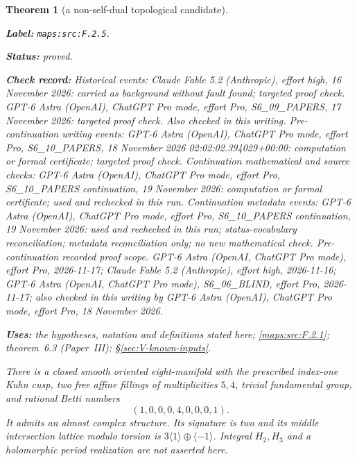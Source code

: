\documentclass[11pt,a4paper]{article}
\newtheorem{theorem}{Theorem}[section]
\theoremstyle{definition}
\newcommand{\StatementRecord}[4]{\par\smallskip\begingroup\upshape\raggedright\noindent\textbf{Label:} \nolinkurl{#1}.\par\noindent\textbf{Status:} #2.\par\noindent\textbf{Check record:} #3.\par\noindent\textbf{Uses:} #4.\par\endgroup\smallskip}
\newcommand{\ExternalPaperRef}[3]{\ifmmode\text{\upshape #1#2 (Paper~#3)}\else #1#2 (Paper~#3)\fi}
\begin{document}
\begin{theorem}[a non-self-dual topological candidate]\label{maps:src:F.2.5}
\StatementRecord{maps:src:F.2.5}{proved}{Historical events: Claude Fable 5.2 (Anthropic), effort high, 16 November 2026: carried as background without fault found; targeted proof check. GPT-6 Astra (OpenAI), ChatGPT Pro mode, effort Pro, S6\_09\_PAPERS, 17 November 2026: targeted proof check. Also checked in this writing. Pre-continuation writing events: GPT-6 Astra (OpenAI), ChatGPT Pro mode, effort Pro, S6\_10\_PAPERS, 18 November 2026 02:02:02.394029+00:00: computation or formal certificate; targeted proof check. Continuation mathematical and source checks: GPT-6 Astra (OpenAI), ChatGPT Pro mode, effort Pro, S6\_10\_PAPERS continuation, 19 November 2026: computation or formal certificate; used and rechecked in this run. Continuation metadata events: GPT-6 Astra (OpenAI), ChatGPT Pro mode, effort Pro, S6\_10\_PAPERS continuation, 19 November 2026: used and rechecked in this run; status-vocabulary reconciliation; metadata reconciliation only; no new mathematical check. \emph{Pre-continuation recorded proof scope.} GPT-6 Astra (OpenAI, ChatGPT Pro mode), effort Pro, 2026-11-17; Claude Fable 5.2 (Anthropic), effort high, 2026-11-16; GPT-6 Astra (OpenAI, ChatGPT Pro mode), S6\_06\_BLIND, effort Pro, 2026-11-17; also checked in this writing by GPT-6 Astra (OpenAI), ChatGPT Pro mode, effort Pro, 18 November 2026}{the hypotheses, notation and definitions stated here; \cref{maps:src:F.2.1}; \ExternalPaperRef{theorem~}{6.3}{III}; \S\ref{sec:V-known-inputs}}


There is a closed smooth oriented eight-manifold with the prescribed
index-one Kuhn cusp, two free affine fillings of multiplicities $5,4$,
trivial fundamental group, and rational Betti numbers
\[
 (1,0,0,0,4,0,0,0,1). \tag{F.5}\label{maps:eq:F.5}
\]
It admits an almost complex structure.  Its signature is two and
its middle intersection lattice modulo torsion is
$3\langle1\rangle\oplus\langle-1\rangle$.
Integral $H_2,H_3$ and a holomorphic period realization are not
asserted here.

\end{theorem}
\end{document}
